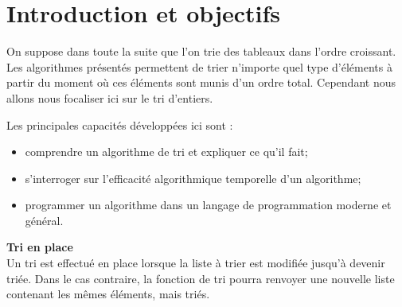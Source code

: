 



% 
%



\section{Introduction et objectifs}

\begin{obj}
On suppose dans toute la suite que l'on trie des tableaux dans l'ordre croissant. Les algorithmes présentés permettent de trier n'importe quel type d'éléments à partir du moment où ces éléments sont munis d'un ordre total. Cependant nous allons nous focaliser ici sur le tri d'entiers.

Les principales capacités développées ici sont :
\begin{itemize}
\item comprendre un algorithme de tri et expliquer ce qu'il fait;
\item s'interroger sur l'efficacité algorithmique temporelle d'un algorithme;
\item programmer un algorithme dans un langage de programmation moderne et général.
\end{itemize}

\end{obj}


%

\begin{defi}\textbf{Tri en place} \\
Un tri est effectué en place lorsque la liste à trier est modifiée jusqu'à devenir triée. Dans le cas contraire, la fonction de tri pourra renvoyer une nouvelle liste contenant les mêmes éléments, mais triés. 
\end{defi}

